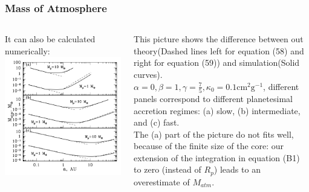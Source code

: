 \documentclass{beamer}
\begin{document}
\begin{frame}
\frametitle{Mass of Atmosphere}
\begin{columns}[t] 
\begin{column}{0.5\textwidth} 
It can also be calculated numerically:
\vspace{-0.1cm}
\includegraphics[width=\textwidth]{Mass of Low-Luminosity Atmosphere.png}
\end{column} 
\begin{column}{0.5\textwidth}
This picture shows the difference between out theory(Dashed lines left for equation (58) and right for equation (59)) and simulation(Solid curves).\\
$\alpha=0, \beta=1, \gamma = \frac{7}{5}, \kappa_0=0.1 \text{cm}^2 \text{g}^{-1}$, different panels correspond to different planetesimal accretion regimes: (a) slow, (b) intermediate, and (c) fast.\\
The (a) part of the picture do not fits well, because of the finite size of the core: our extension of the integration in equation (B1) to zero (instead of $R_p$) leads to an overestimate of $M_{atm}$.
\end{column} 
\end{columns}
\end{frame}
\end{document}
